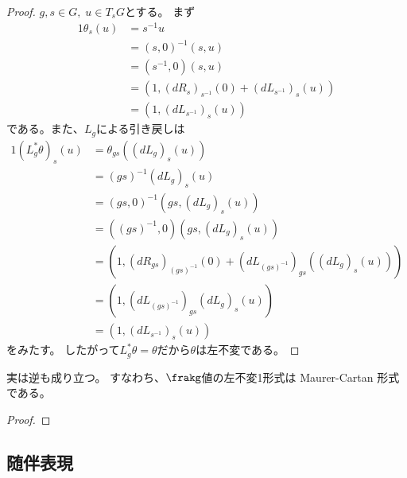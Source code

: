 \documentclass[report]{jlreq}
\begin{document}
\begin{proof}
    $g, s \in G,\; u \in T_sG$とする。
    まず
    \begin{alignat}{1}
        \theta_s(u)
            &= s^{-1}u \\
            &= (s, 0)^{-1} (s, u) \\
            &= (s^{-1}, 0) (s, u) \\
            &= (1, (dR_s)_{s^{-1}}(0) + (dL_{s^{-1}})_s(u)) \\
            &= (1, (dL_{s^{-1}})_s(u))
    \end{alignat}
    である。また、$L_g$による引き戻しは
    \begin{alignat}{1}
        (L_g^* \theta)_s (u)
            &= \theta_{gs} ((dL_g)_s(u)) \\
            &= (gs)^{-1} (dL_g)_s(u) \\
            &= (gs, 0)^{-1} (gs, (dL_g)_s(u)) \\
            &= ((gs)^{-1}, 0) (gs, (dL_g)_s(u)) \\
            &= (1, (dR_{gs})_{(gs)^{-1}}(0) + (dL_{(gs)^{-1}})_{gs}((dL_g)_s(u))) \\
            &= (1, (dL_{(gs)^{-1}})_{gs}(dL_g)_s(u)) \\
            &= (1, (dL_{s^{-1}})_s(u))
    \end{alignat}
    をみたす。
    したがって$L_g^* \theta = \theta$だから$\theta$は左不変である。
\end{proof}

実は逆も成り立つ。
すなわち、$\frakg$値の左不変1形式は Maurer-Cartan 形式である。

\begin{proposition}
    \TODO{}
\end{proposition}

\begin{proof}
    \TODO{}
\end{proof}


\subsection{随伴表現}

\end{document}
